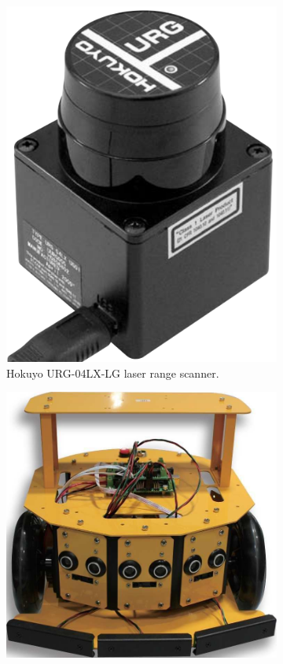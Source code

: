 \begin{figure}[ht]
\centering
  \begin{subfigure}[t]{0.3\textwidth}
    \includegraphics[width = \textwidth]{graphics/hokuyo_laserrange}
    \caption{Hokuyo URG-04LX-LG laser range scanner.}
    \label{laserrange}
  \end{subfigure}
  \begin{subfigure}[t]{0.4\textwidth}
    \includegraphics[width = \textwidth]{graphics/nexus_robot}

\end{subfigure}
\end{figure}
